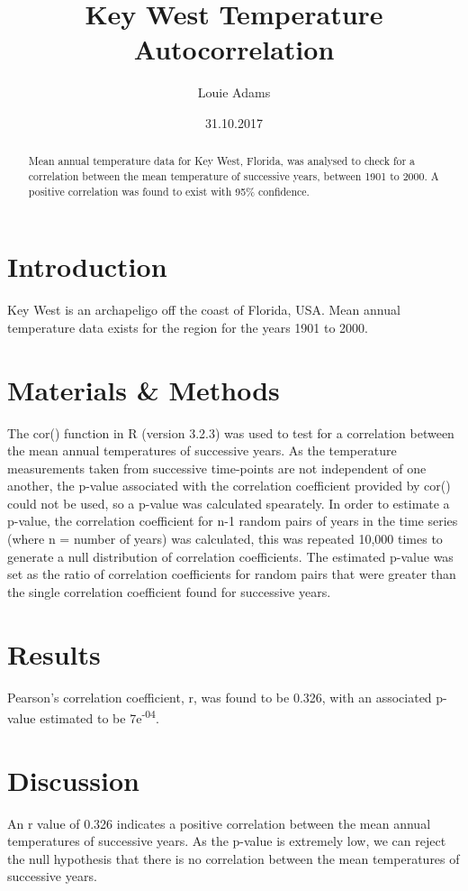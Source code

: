 \documentclass[12pt]{article}
\title{Key West Temperature Autocorrelation}
\author{Louie Adams}
\date{31.10.2017}
\begin{document}
	\maketitle
	
	\begin{abstract}
		Mean annual temperature data for Key West, Florida, was \linebreak analysed to check for a correlation between the mean temperature of successive years, between 1901 to 2000. A positive correlation was found to exist with 95\% confidence. 
	\end{abstract}
	
	\section{Introduction}
		Key West is an archapeligo off the coast of Florida, USA. Mean annual temperature data exists for the region for the years 1901 to 2000.  
		
	\section{Materials \& Methods}
	The cor() function in R (version 3.2.3) was used to test for a correlation between the mean annual temperatures of successive years. As the temperature measurements taken from successive time-points are not independent of one another, the p-value associated with the correlation coefficient provided by cor() could not be used, so a p-value was calculated spearately. In order to estimate a p-value, the correlation coefficient for n-1 random pairs of years in the time series (where n = number of years) was calculated, this was repeated 10,000 times to generate a null distribution of correlation coefficients. The estimated p-value was set as the ratio of correlation coefficients for random pairs that were greater than the single correlation coefficient found for successive years. 

	\section{Results}
	Pearson's correlation coefficient, r, was found to be 0.326, with an associated p-value estimated to be 7e\textsuperscript{-04}. 
	
	\section{Discussion}
	An r value of 0.326 indicates a positive correlation between the mean annual temperatures of successive years. As the p-value is extremely low, we can reject the null hypothesis that there is no correlation between the mean temperatures of successive years.
	
	
	
\end{document}
